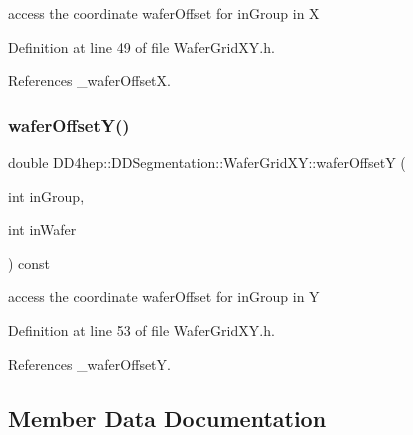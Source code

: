 access the coordinate wafer\+Offset for in\+Group in X 



Definition at line 49 of file Wafer\+Grid\+X\+Y.\+h.



References \+\_\+wafer\+OffsetX.

\hypertarget{class_d_d4hep_1_1_d_d_segmentation_1_1_wafer_grid_x_y_ad6f8071dae67ae2f13081f9d1c2462d7}{}\label{class_d_d4hep_1_1_d_d_segmentation_1_1_wafer_grid_x_y_ad6f8071dae67ae2f13081f9d1c2462d7} 
\subsubsection{\texorpdfstring{wafer\+Offset\+Y()}{waferOffsetY()}}
{\footnotesize\ttfamily double D\+D4hep\+::\+D\+D\+Segmentation\+::\+Wafer\+Grid\+X\+Y\+::wafer\+OffsetY (\begin{DoxyParamCaption}\item[{int}]{in\+Group,  }\item[{int}]{in\+Wafer }\end{DoxyParamCaption}) const\hspace{0.3cm}{\ttfamily [inline]}}



access the coordinate wafer\+Offset for in\+Group in Y 



Definition at line 53 of file Wafer\+Grid\+X\+Y.\+h.



References \+\_\+wafer\+OffsetY.



\subsection{Member Data Documentation}
\hypertarget{class_d_d4hep_1_1_d_d_segmentation_1_1_wafer_grid_x_y_af1d00f186fda3aca2aed961911bc3c04}{}\label{class_d_d4hep_1_1_d_d_segmentation_1_1_wafer_grid_x_y_af1d00f186fda3aca2aed961911bc3c04} 
